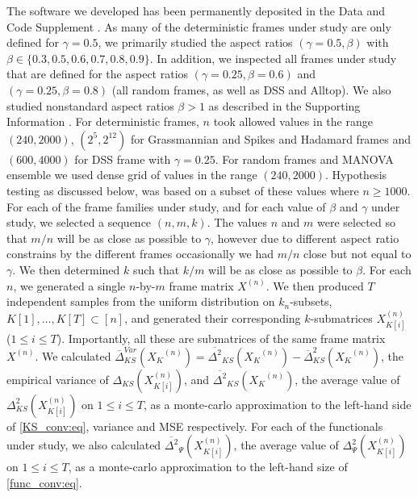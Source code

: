 \documentclass[a4paper,12pt]{article}
\newcommand{\m}{m}
\newcommand{\specstat}{\ensuremath{\Psi}}
\newcommand{\Xk}{\ensuremath{X_K}}
\begin{document}
The software we developed has been permanently deposited 
in the Data and Code Supplement \cite{SDR}.
As many of the deterministic frames under study are only defined for $\gamma=0.5$, 
we primarily studied the aspect ratios $(\gamma=0.5,\beta)$ with 
$\beta\in\{0.3,0.5,0.6,0.7,0.8,0.9\}$.
In addition, we inspected all frames under study that are defined for the aspect ratios $(\gamma=0.25,\beta=0.6)$ and $(\gamma=0.25,\beta=0.8)$ (all random frames, as well as DSS and Alltop).
We also studied nonstandard aspect ratios $\beta>1$ as described in the
Supporting
Information \cite{SI}. 
For deterministic frames, $n$ took allowed values in the range 
$(240,2000)$, $(2^5,2^{12})$ for Grassmannian and Spikes and Hadamard frames and $(600,4000)$ for DSS frame with $\gamma=0.25$.
For random frames and MANOVA ensemble we used
dense grid of values in the range $(240,2000)$. 
Hypothesis testing as discussed below, 
was based on a subset of these values where $n\ge 1000$.
For each of the frame families under study, and for each value of $\beta$ and
$\gamma$ under study, we selected a sequence $(n,\m,k)$.
The values $n$ and $m$ were selected so that $m/n$ will be as close as
possible to $\gamma$, however due to different aspect ratio constrains by the
different frames occasionally we had $m/n$ close but not equal to $\gamma$.
We then determined $k$ such that $k/\m$ will be as close as
possible to $\beta$.
For each $n$, we generated a single 
$n$-by-$\m$ frame matrix
$X^{(n)}$.
We then produced $T$ independent samples from the uniform
distribution on $k_n$-subsets,
$K[1],\ldots,K[T]\subset[n]$, and generated 
their corresponding $k$-submatrices 
$X_{K[i]}^{(n)}$ ($1\leq i\leq T$). Importantly, all these are submatrices of
the same frame matrix $X^{(n)}$.
We calculated $\overline{\Delta}^{Var}_{KS}(\Xk^{(n)})=\overline{\Delta^2}_{KS}(\Xk^{(n)})-\overline{\Delta}^2_{KS}(\Xk^{(n)})$, the empirical variance of 
$ \Delta_{KS}(X_{K[i]}^{(n)})$, and $\overline{\Delta^2}_{KS}(\Xk^{(n)})$, the average value of $ \Delta^2_{KS}(X_{K[i]}^{(n)})$ on $1\leq i\leq T$, as a 
monte-carlo approximation  to the left-hand side of \eqref{KS_conv:eq}, variance and MSE respectively. For each
of the functionals under study, we also calculated 
$ \overline{\Delta^2}_\specstat(X_{K[i]}^{(n)})$,
the average value of 
$ \Delta^2_\specstat(X_{K[i]}^{(n)})$ on 
$1\leq i\leq T$, as a monte-carlo approximation to the left-hand size of 
\eqref{func_conv:eq}.
\end{document}
